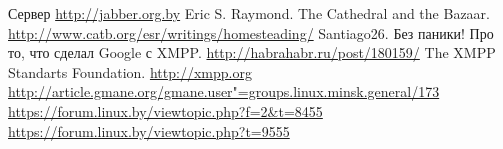 \documentclass[10pt, a5paper]{article}
\begin{document}
\begin{thebibliography}{9}
   Сервер \url{http://jabber.org.by}
   Eric S. Raymond. The Cathedral and the Bazaar. \url{http://www.catb.org/esr/writings/homesteading/}
   Santiago26. Без паники! Про то, что сделал Google с XMPP. \url{http://habrahabr.ru/post/180159/}
   The XMPP Standarts Foundation. \url{http://xmpp.org}
 \url{http://article.gmane.org/gmane.user"=groups.linux.minsk.general/173}
 \url{https://forum.linux.by/viewtopic.php?f=2&t=8455}
  \url{https://forum.linux.by/viewtopic.php?t=9555}
\end{thebibliography}
\end{document}
